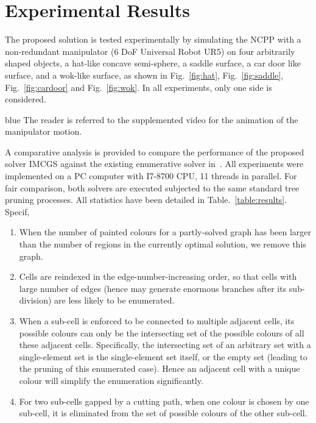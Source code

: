 \documentclass[journal]{IEEEtran}
\begin{document}
\section{Experimental Results}\label{section_experiment}
\label{section_results}

The proposed solution is tested experimentally by simulating the NCPP with a non-redundant manipulator (6 DoF Universal Robot UR5) on four arbitrarily shaped objects, a hat-like concave semi-sphere, a saddle surface, a car door like surface, and a wok-like surface, as shown in Fig.~\ref{fig:hat}, Fig.~\ref{fig:saddle}, Fig.~\ref{fig:cardoor} and Fig.~\ref{fig:wok}.
In all experiments, only one side is considered. 
\begin{color}{blue}
The reader is referred to the supplemented video for the animation of the manipulator motion. 

A comparative analysis is provided to compare the performance of the proposed solver IMCGS against the existing enumerative solver in~\cite{Yang2020Cellular}. 
All experiments were implemented on a PC computer with I7-8700 CPU, 11 threads in parallel. 
For fair comparison, both solvers are executed subjected to the same standard tree pruning processes. 
All statistics have been detailed in Table.~\ref{table:results}.
Specif, 
\begin{enumerate}
\item When the number of painted colours for a partly-solved graph has been larger than the number of regions in the currently optimal solution, we remove this graph. 
\item Cells are reindexed in the edge-number-increasing order, so that cells with large number of edges (hence may generate enormous branches after its sub-division) are less likely to be enumerated. 
\item When a sub-cell is enforced to be connected to multiple adjacent cells, its possible colours can only be the intersecting set of the possible colours of all these adjacent cells. 
Specifically, the intersecting set of an arbitrary set with a single-element set is the single-element set itself, or the empty set (leading to the pruning of this enumerated case). 
Hence an adjacent cell with a unique colour will simplify the enumeration significantly. 
\item For two sub-cells gapped by a cutting path, when one colour is chosen by one sub-cell, it is eliminated from the set of possible colours of the other sub-cell.
\end{enumerate}
\end{color}
\end{document}
